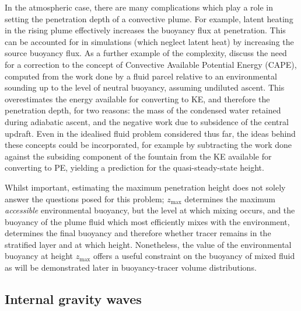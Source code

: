 \documentclass[a4paper]{article}
\begin{document}
In the atmospheric case, there are many complications which play a role in setting the penetration depth
of a convective plume. For example, latent heating in the rising plume effectively increases the buoyancy
flux at penetration. This can be accounted for in simulations (which neglect latent heat) by increasing the
source buoyancy flux. As a further example of the complexity, \citet{tailleux2004} discuss the need for a
correction to the concept of Convective Available Potential Energy (CAPE), computed from the work done by a
fluid parcel relative to an environmental sounding up to the level of neutral buoyancy, assuming undiluted
ascent. This overestimates the energy available for converting to KE, and therefore the penetration depth, for
two reasons: the mass of the condensed water retained during adiabatic ascent, and the negative work due to
subsidence of the central updraft. Even in the idealised fluid problem considered thus far, the ideas behind
these concepts could be incorporated, for example by subtracting the work done against the subsiding component
of the fountain from the KE available for converting to PE, yielding a prediction for the quasi-steady-state
height.

Whilst important, estimating the maximum penetration height does not solely answer the questions posed for
this problem; $z_{\max}$ determines the maximum \emph{accessible} environmental buoyancy, but the level at
which mixing occurs, and the buoyancy of the plume fluid which most efficiently mixes with the environment,
determines the final buoyancy and therefore whether tracer remains in the stratified layer and at which
height. Nonetheless, the value of the environmental buoyancy at height $z_{\max}$ offers a useful constraint
on the buoyancy of mixed fluid as will be demonstrated later in buoyancy-tracer volume distributions.

\subsection{Internal gravity waves}
\end{document}
